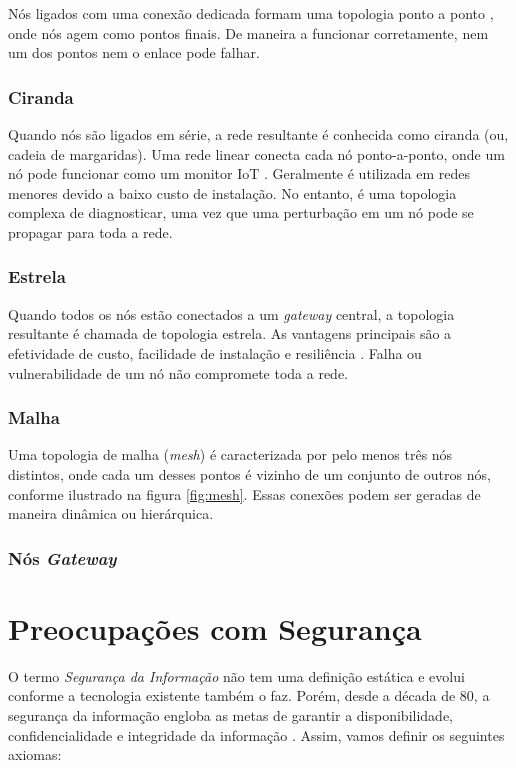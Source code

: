 \documentclass[tcc,capa]{texufpel}
\begin{document}
Nós ligados com uma conexão dedicada formam uma topologia ponto a ponto \cite{schiller}, onde nós agem como pontos finais. De maneira a funcionar  corretamente, nem um dos pontos nem o enlace pode falhar.

\subsubsection{Ciranda}

Quando nós são ligados em série, a rede resultante é conhecida como ciranda (ou, cadeia de margaridas). Uma rede linear conecta cada nó ponto-a-ponto, onde um nó pode funcionar como um monitor IoT \cite{schiller}.  Geralmente é utilizada em redes menores devido a baixo custo de instalação. No entanto, é uma topologia complexa de diagnosticar, uma vez que uma perturbação em um nó pode se propagar para toda a rede.

\subsubsection{Estrela}

Quando todos os nós estão conectados a um \textit{gateway} central, a topologia resultante é chamada de topologia estrela. As vantagens principais são a efetividade de custo, facilidade de instalação e resiliência \cite{schiller}. Falha ou vulnerabilidade de um nó não compromete toda a rede.

\subsubsection{Malha}

Uma topologia de malha (\textit{mesh}) é caracterizada por pelo menos três nós distintos, onde cada um desses pontos é vizinho de um conjunto de outros nós, conforme ilustrado na figura \ref{fig:mesh}. Essas conexões podem ser geradas de maneira dinâmica ou hierárquica.

\subsubsection{Nós \textit{Gateway}}

\section{Preocupações com Segurança} 

O termo \textit{Segurança da Informação} não tem uma definição estática e evolui conforme a tecnologia existente também o faz. Porém, desde a década de 80, a segurança da informação engloba as metas de garantir a disponibilidade, confidencialidade e integridade da informação \cite{schiller}. Assim, vamos definir os seguintes axiomas:
\end{document}

